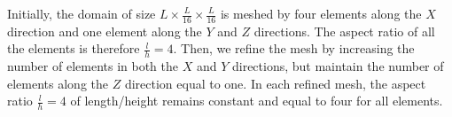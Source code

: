 \documentclass[12pt]{article}
\begin{document}
Initially, the domain of size $L \times \frac{L}{16} \times \frac{L}{16}$ is
meshed by four elements along the $X$ direction and one element along the $Y$
and $Z$ directions. The aspect ratio of all the elements is therefore
$\frac{l}{h}=4$. Then, we refine the mesh by increasing the number of elements
in both the $X$ and $Y$ directions, but maintain the number of elements along
the $Z$ direction equal to one.  In each refined mesh, the aspect ratio
$\frac{l}{h}=4$ of length/height remains constant and equal to four for all
elements.

\begin{figure}[htbp]
  \begin{center}
    \unitlength=1.0mm

\end{center}
\end{figure}
\end{document}
